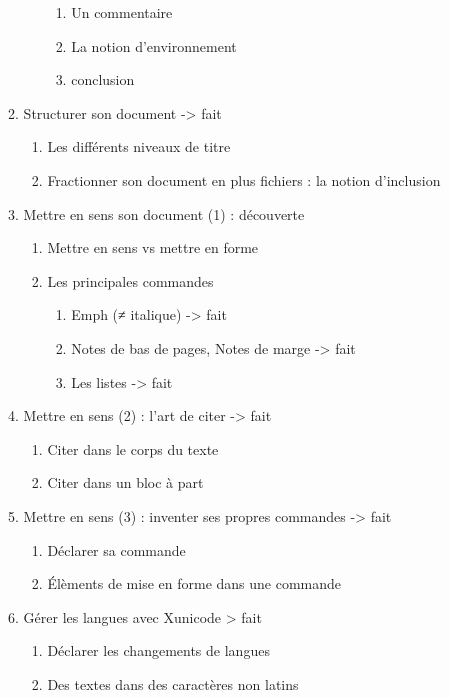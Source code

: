 \begin{enumerate}
\begin{enumerate}
\begin{enumerate}
\begin{enumerate}
			\item Un commentaire
			\item La notion d'environnement			
			\item conclusion	
		\end{enumerate}
	\end{enumerate} 
	\item{Structurer son document}						-> fait
		\begin{enumerate}	
		\item Les différents niveaux de titre
		\item Fractionner son document en plus fichiers : la notion d'inclusion
		\end{enumerate}
	\item Mettre en sens son document (1) : découverte
	\begin{enumerate}
		\item Mettre en sens vs mettre en forme
		\item Les principales commandes
		\begin{enumerate}
			\item Emph (≠ italique)					-> fait
			\item Notes de bas de pages, Notes de marge	-> fait
			\item Les listes						-> fait
		\end{enumerate}
	\end{enumerate}
	\item Mettre en sens (2) : l'art de citer					-> fait
		\begin{enumerate}
		\item Citer dans le corps du texte	
		\item Citer dans un bloc à part
		\end{enumerate}
	\item Mettre en sens (3) : inventer ses propres commandes	-> fait
		\begin{enumerate}
		\item Déclarer sa commande
		\item Élèments de mise en forme dans une commande
		\end{enumerate}
	\item Gérer les langues avec Xunicode					 > fait
		\begin{enumerate}
		\item Déclarer les changements de langues
		\item Des textes dans des caractères non latins

\end{enumerate}
\end{enumerate}
\end{enumerate}

